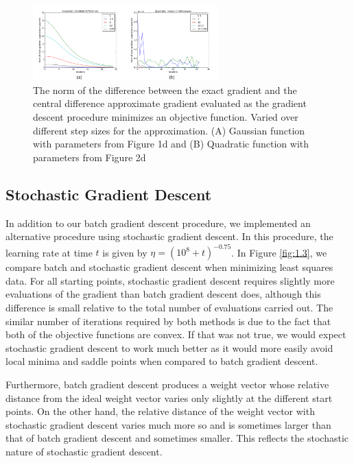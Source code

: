 \documentclass[10pt, twocolumn]{article}
\begin{document}
\begin{figure}
\centering
\includegraphics[width=270px]{all_finite_difference}
\caption{The norm of the difference between the exact gradient and the central difference approximate gradient evaluated as the gradient descent procedure minimizes an objective function. Varied over different step sizes for the approximation. (A) Gaussian function with parameters from Figure 1d and (B) Quadratic function with parameters from Figure 2d}
\label{fig:1.2}
\end{figure}


\subsection{Stochastic Gradient Descent}

In addition to our batch gradient descent procedure, we implemented an alternative procedure using stochastic gradient descent. In this procedure, the learning rate at time $t$ is given by $\eta = (10^8 +t)^{-0.75}$. In Figure \ref{fig:1.3}, we compare batch and stochastic gradient descent when minimizing least squares data. For all starting points, stochastic gradient descent requires slightly more evaluations of the gradient than batch gradient descent does, although this difference is small relative to the total number of evaluations carried out. The similar number of iterations required by both methods is due to the fact that both of the objective functions are convex. If that was not true, we would expect stochastic gradient descent to work much better as it would more easily avoid local minima and saddle points when compared to batch gradient descent.

Furthermore, batch gradient descent produces a weight vector whose relative distance from the ideal weight vector varies only slightly at the different start points. On the other hand, the relative distance of the weight vector with stochastic gradient descent varies much more so and is sometimes larger than that of batch gradient descent and sometimes smaller. This reflects the stochastic nature of stochastic gradient descent.
\end{document}
